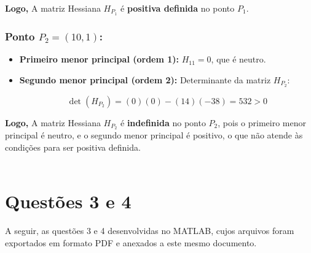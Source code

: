 \documentclass[a4paper, 12pt]{article}
\begin{document}
\textbf{Logo,} A matriz Hessiana \( H_{P_1} \) é \textbf{positiva definida} no ponto \( P_1 \).

\subsubsection{Ponto \( P_2 = (10, 1) \):}

\begin{itemize}
    \item \textbf{Primeiro menor principal (ordem 1):} \( H_{11} = 0 \), que é neutro.
    \item \textbf{Segundo menor principal (ordem 2):} Determinante da matriz \( H_{P_2} \):

    \[
    \det(H_{P_2}) = (0)(0) - (14)(-38) = 532 > 0
    \]

\end{itemize}

\textbf{Logo,} A matriz Hessiana \( H_{P_2} \) é \textbf{indefinida} no ponto \( P_2 \), pois o primeiro menor principal é neutro, e o segundo menor principal é positivo, o que não atende às condições para ser positiva definida.\\ \\ 

\section{Questões 3 e 4}

A seguir, as questões 3 e 4 desenvolvidas no MATLAB, cujos arquivos foram exportados em formato PDF e anexados a este mesmo documento.


\newpage
\end{document}
